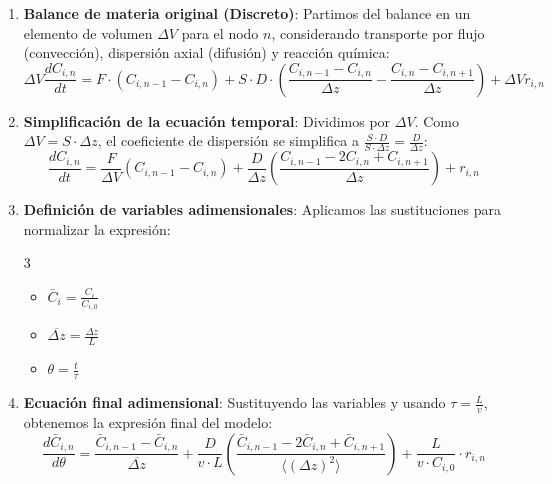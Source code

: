 \begin{enumerate}
    \item \textbf{Balance de materia original (Discreto)}: Partimos del balance en un elemento de volumen $\Delta V$ para el nodo $n$, considerando transporte por flujo (convección), dispersión axial (difusión) y reacción química:
          \begin{equation}
              \Delta V \frac{dC_{i,n}}{dt} = F \cdot (C_{i,n-1} - C_{i,n}) + S \cdot D \cdot \left( \frac{C_{i,n-1} - C_{i,n}}{\Delta z} - \frac{C_{i,n} - C_{i,n+1}}{\Delta z} \right) + \Delta V r_{i,n}
          \end{equation}

    \item \textbf{Simplificación de la ecuación temporal}: Dividimos por $\Delta V$. Como $\Delta V = S \cdot \Delta z$, el coeficiente de dispersión se simplifica a $\frac{S \cdot D}{S \cdot \Delta z} = \frac{D}{\Delta z}$:
          \begin{equation}
              \frac{dC_{i,n}}{dt} = \frac{F}{\Delta V} (C_{i,n-1} - C_{i,n}) + \frac{D}{\Delta z} \left( \frac{C_{i,n-1} - 2C_{i,n} + C_{i,n+1}}{\Delta z} \right) + r_{i,n}
          \end{equation}

    \item \textbf{Definición de variables adimensionales}: Aplicamos las sustituciones para normalizar la expresión:
          \begin{multicols}{3}
              \begin{itemize}
                  \item $\bar{C}_i = \frac{C_i}{C_{i,0}}$
                  \item $\overline{\Delta z} = \frac{\Delta z}{L}$
                  \item $\theta = \frac{t}{\tau}$
              \end{itemize}
          \end{multicols}

    \item \textbf{Ecuación final adimensional}: Sustituyendo las variables y usando $\tau = \frac{L}{v}$, obtenemos la expresión final del modelo:
          \begin{equation}
              \frac{d\bar{C}_{i,n}}{d\theta} = \frac{\bar{C}_{i,n-1} - \bar{C}_{i,n}}{\overline{\Delta z}} + \frac{D}{v \cdot L} \left( \frac{\bar{C}_{i,n-1} - 2\bar{C}_{i,n} + \bar{C}_{i,n+1}}{\langle (\Delta z)^2 \rangle} \right) + \frac{L}{v \cdot C_{i,0}} \cdot r_{i,n}
          \end{equation}
\end{enumerate}

